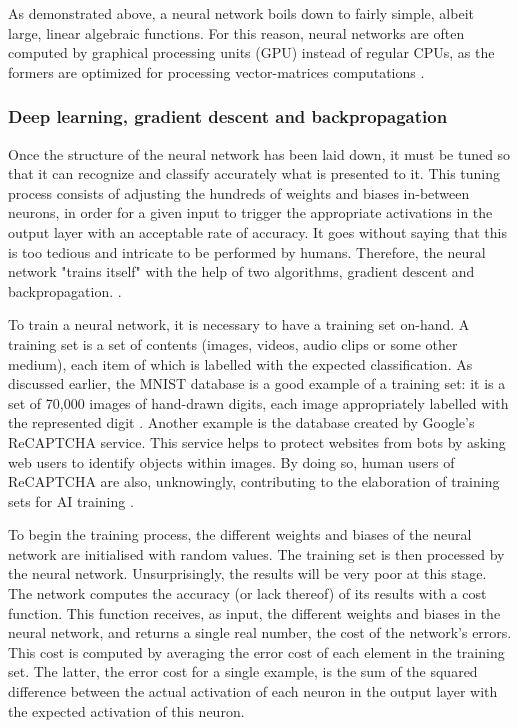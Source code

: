 \documentclass[12pt,a4paper,titlepage]{article}
\begin{document}
As demonstrated above, a neural network boils down to fairly simple, albeit large, linear algebraic functions. For this reason, neural networks are often computed by graphical processing units (GPU) instead of regular CPUs, as the formers are optimized for processing vector-matrices computations \cite{salter_cart_2022}.

\subsubsection{Deep learning, gradient descent and backpropagation}
Once the structure of the neural network has been laid down, it must be tuned so that it can recognize and classify accurately what is presented to it. This tuning process consists of adjusting the hundreds of weights and biases in-between neurons, in order for a given input to trigger the appropriate activations in the output layer with an acceptable rate of accuracy. It goes without saying that this is too tedious and intricate to be performed by humans. Therefore, the neural network "trains itself" with the help of two algorithms, gradient descent and backpropagation. \cite{ibm_cloud_education_what_2020}.

To train a neural network, it is necessary to have a training set on-hand. A training set is a set of contents (images, videos, audio clips or some other medium), each item of which is labelled with the expected classification. As discussed earlier, the MNIST database is a good example of a training set: it is a set of 70,000 images of hand-drawn digits, each image appropriately labelled with the represented digit \cite{lecun_mnist_1998}. Another example is the database created by Google's ReCAPTCHA service. This service helps to protect websites from bots by asking web users to identify objects within images. By doing so, human users of ReCAPTCHA are also, unknowingly, contributing to the elaboration of training sets for AI training \cite{maruzani_are_2021}.

To begin the training process, the different weights and biases of the neural network are initialised with random values. The training set is then processed by the neural network. Unsurprisingly, the results will be very poor at this stage. The network computes the accuracy (or lack thereof) of its results with a cost function. This function receives, as input, the different weights and biases in the neural network, and returns a single real number, the cost of the network's errors. This cost is computed by averaging the error cost of each element in the training set. The latter, the error cost for a single example, is the sum of the squared difference between the actual activation of each neuron in the output layer with the expected activation of this neuron.
\end{document}
